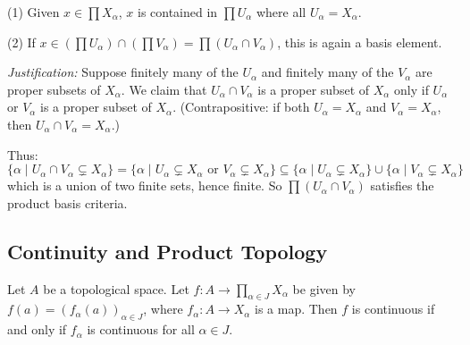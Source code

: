 \documentclass[11pt]{report}
\begin{document}
\begin{rembox}
(1) Given $x \in \prod X_\alpha$, $x$ is contained in $\prod U_\alpha$ where all $U_\alpha = X_\alpha$.

(2) If $x \in (\prod U_\alpha) \cap (\prod V_\alpha) = \prod (U_\alpha \cap V_\alpha)$, this is again a basis element. 

\textit{Justification:} Suppose finitely many of the $U_\alpha$ and finitely many of the $V_\alpha$ are proper subsets of $X_\alpha$. We claim that $U_\alpha \cap V_\alpha$ is a proper subset of $X_\alpha$ only if $U_\alpha$ or $V_\alpha$ is a proper subset of $X_\alpha$. (Contrapositive: if both $U_\alpha = X_\alpha$ and $V_\alpha = X_\alpha$, then $U_\alpha \cap V_\alpha = X_\alpha$.)

Thus:
\[\{\alpha \mid U_\alpha \cap V_\alpha \subsetneq X_\alpha\} = \{\alpha \mid U_\alpha \subsetneq X_\alpha \text{ or } V_\alpha \subsetneq X_\alpha\} \subseteq \{\alpha \mid U_\alpha \subsetneq X_\alpha\} \cup \{\alpha \mid V_\alpha \subsetneq X_\alpha\}\]
which is a union of two finite sets, hence finite. So $\prod(U_\alpha \cap V_\alpha)$ satisfies the product basis criteria.
\end{rembox}

\subsection{Continuity and Product Topology}

\begin{thmbox}
Let $A$ be a topological space. Let $f: A \to \prod_{\alpha \in J} X_\alpha$ be given by $f(a) = (f_\alpha(a))_{\alpha \in J}$, where $f_\alpha: A \to X_\alpha$ is a map. Then $f$ is continuous if and only if $f_\alpha$ is continuous for all $\alpha \in J$.
\end{thmbox}
\end{document}
